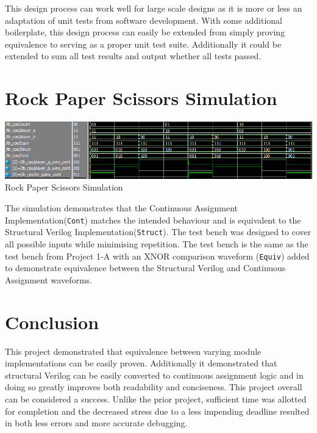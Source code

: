 \documentclass[12pt,letterpaper,titlepage]{article}
\begin{document}
\begin{raggedright}
This design process can work well for large scale designs as it is more or less an adaptation of unit tests from software development. With some additional boilerplate, this design process can easily be extended from simply proving equivalence to serving as a proper unit test suite. Additionally it could be extended to sum all test results and output whether all tests passed.  
\clearpage
\section{Rock Paper Scissors Simulation}
\begin{center}
\includegraphics[width=\textwidth]{tb_rps}
Rock Paper Scissors Simulation
\end{center}

The simulation demonstrates that the Continuous Assignment Implementation(\texttt{Cont}) matches the intended behaviour and is equivalent to the Structural Verilog Implementation(\texttt{Struct}). The test bench was designed to cover all possible inputs while minimising repetition. The test bench is the same as the test bench from Project 1-A with an XNOR comparison waveform (\texttt{Equiv}) added to demonstrate equivalence between the Structural Verilog and Continuous Assignment waveforms.

\section{Conclusion}

This project demonstrated that equivalence between varying module implementations can be easily proven. Additionally it demonstrated that structural Verilog can be easily converted to continuous assignment logic and in doing so greatly improves both readability and conciseness. This project overall can be considered a success. Unlike the prior project, sufficient time was allotted for completion and the decreased stress due to a less impending deadline resulted in both less errors and more accurate debugging.


\end{raggedright}
\end{document}
